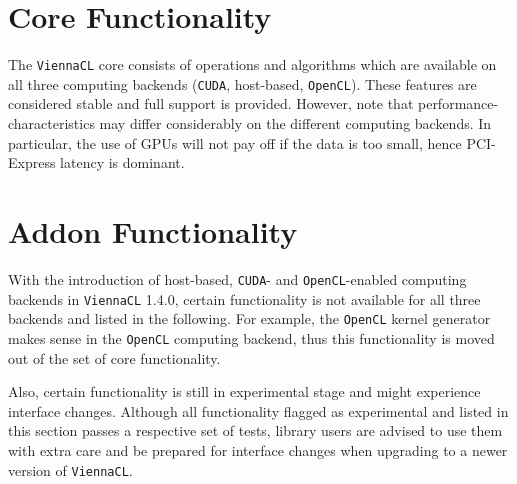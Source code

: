 \documentclass[11pt]{report}
\newcommand{\OpenCL} {\texttt{OpenCL}}
\newcommand{\CUDA} {\texttt{CUDA}}
\newcommand{\ViennaCL} {\texttt{ViennaCL}}
\begin{document}




\clearpage

\tableofcontents

\clearpage
{}




\part{Core Functionality}
The {\ViennaCL} core consists of operations and algorithms which are available on all three computing backends ({\CUDA}, host-based, {\OpenCL}).
These features are considered stable and full support is provided. However, note that performance-characteristics may differ considerably on the different computing backends.
In particular, the use of GPUs will not pay off if the data is too small, hence PCI-Express latency is dominant.












\part{Addon Functionality}
With the introduction of host-based, {\CUDA}- and {\OpenCL}-enabled computing backends in {\ViennaCL} 1.4.0, certain functionality is not available for all three backends and listed in the following.
For example, the {\OpenCL} kernel generator makes sense in the {\OpenCL} computing backend, thus this functionality is moved out of the set of core functionality.

Also, certain functionality is still in experimental stage and might experience interface changes.
Although all functionality flagged as experimental and listed in this section passes a respective set of tests,
library users are advised to use them with extra care and be prepared for interface changes when upgrading to a newer version of {\ViennaCL}.








\end{document}
